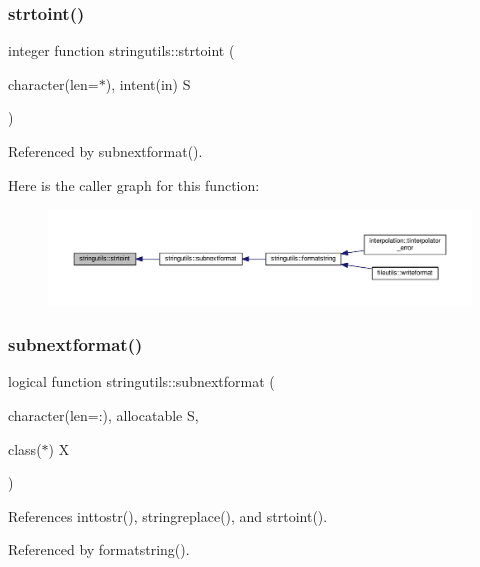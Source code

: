 \subsubsection{\texorpdfstring{strtoint()}{strtoint()}}
{\footnotesize\ttfamily integer function stringutils\+::strtoint (\begin{DoxyParamCaption}\item[{character(len=$\ast$), intent(in)}]{S }\end{DoxyParamCaption})}



Referenced by subnextformat().

Here is the caller graph for this function\+:
\nopagebreak
\begin{figure}[H]
\begin{center}
\leavevmode
\includegraphics[width=350pt]{namespacestringutils_af51a1a8adbae76da62979f25232bd8df_icgraph}
\end{center}
\end{figure}
\mbox{\label{namespacestringutils_a052ed985538275100bc601b4bfffde94}} 
\subsubsection{\texorpdfstring{subnextformat()}{subnextformat()}}
{\footnotesize\ttfamily logical function stringutils\+::subnextformat (\begin{DoxyParamCaption}\item[{character(len=\+:), allocatable}]{S,  }\item[{class($\ast$)}]{X }\end{DoxyParamCaption})}



References inttostr(), stringreplace(), and strtoint().



Referenced by formatstring().

